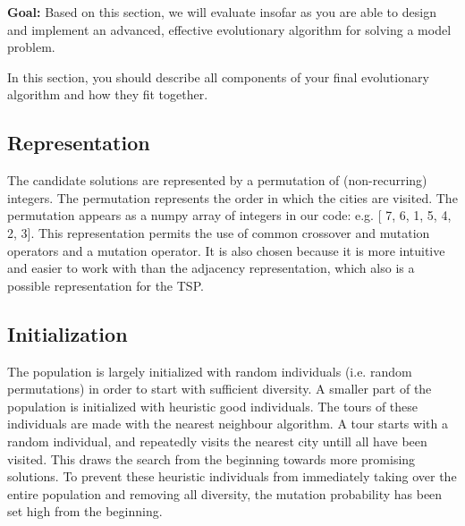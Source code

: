 \documentclass[a4paper,10pt]{article}
\newcommand{\ReplaceMe}[1]{{\color{blue}#1}}
\newcommand{\RemoveMe}[1]{{\color{purple}#1}}
\begin{document}
\RemoveMe{\textbf{Goal:} Based on this section, we will evaluate insofar as you are able to design and implement an advanced, effective evolutionary algorithm for solving a model problem.}

\ReplaceMe{In this section, you should describe all components of your final evolutionary algorithm and how they fit together.}

\subsection{Representation}\label{ssec:representation}

The candidate solutions are represented by a permutation of (non-recurring) integers. The permutation represents the order in which the cities are visited. The permutation appears as a numpy array of integers in our code: e.g. [ 7, 6, 1, 5, 4, 2, 3]. This representation permits the use of common crossover and mutation operators and a mutation operator. It is also chosen because it is more intuitive and easier to work with than the adjacency representation, which also is a possible representation for the TSP. 

\subsection{Initialization}\label{ssec:initialization}

The population is largely initialized with random individuals (i.e. random permutations) in order to start with sufficient diversity. A smaller part of the population is initialized with heuristic good individuals. The tours of these individuals are made with the nearest neighbour algorithm. A tour starts with a random individual, and repeatedly visits the nearest city untill all have been visited. This draws the search from the beginning towards more promising solutions. To prevent these heuristic individuals from immediately taking over the entire population and removing all diversity, the mutation probability has been set high from the beginning. 
\end{document}
